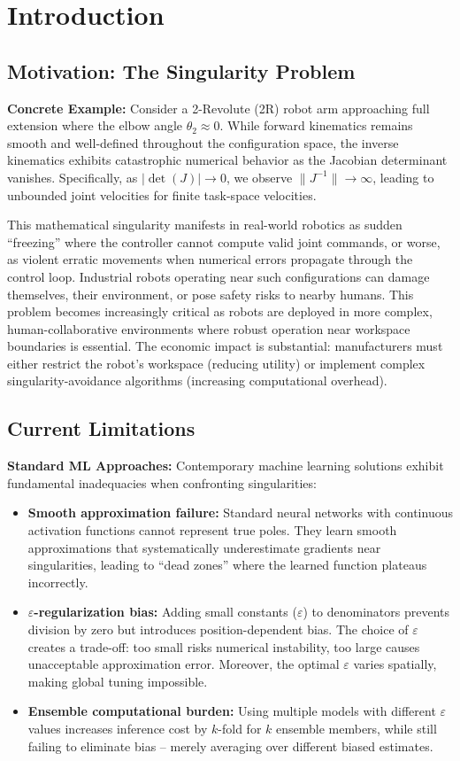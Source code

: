\documentclass[twoside,11pt]{article}
\begin{document}
\section{Introduction}
\subsection{Motivation: The Singularity Problem}
\textbf{Concrete Example:} Consider a 2-Revolute (2R) robot arm approaching full extension where the elbow angle $\theta_2 \approx 0$. While forward kinematics remains smooth and well-defined throughout the configuration space, the inverse kinematics exhibits catastrophic numerical behavior as the Jacobian determinant vanishes. Specifically, as $|\det(J)| \to 0$, we observe $\|J^{-1}\| \to \infty$, leading to unbounded joint velocities for finite task-space velocities.

This mathematical singularity manifests in real-world robotics as sudden ``freezing'' where the controller cannot compute valid joint commands, or worse, as violent erratic movements when numerical errors propagate through the control loop. Industrial robots operating near such configurations can damage themselves, their environment, or pose safety risks to nearby humans. This problem becomes increasingly critical as robots are deployed in more complex, human-collaborative environments where robust operation near workspace boundaries is essential. The economic impact is substantial: manufacturers must either restrict the robot's workspace (reducing utility) or implement complex singularity-avoidance algorithms (increasing computational overhead).
\subsection{Current Limitations}
\textbf{Standard ML Approaches:} Contemporary machine learning solutions exhibit fundamental inadequacies when confronting singularities:
\begin{itemize}
\item \textbf{Smooth approximation failure:} Standard neural networks with continuous activation functions cannot represent true poles. They learn smooth approximations that systematically underestimate gradients near singularities, leading to ``dead zones'' where the learned function plateaus incorrectly.
\item \textbf{$\varepsilon$-regularization bias:} Adding small constants ($\varepsilon$) to denominators prevents division by zero but introduces position-dependent bias. The choice of $\varepsilon$ creates a trade-off: too small risks numerical instability, too large causes unacceptable approximation error. Moreover, the optimal $\varepsilon$ varies spatially, making global tuning impossible.
\item \textbf{Ensemble computational burden:} Using multiple models with different $\varepsilon$ values increases inference cost by $k$-fold for $k$ ensemble members, while still failing to eliminate bias -- merely averaging over different biased estimates.
\end{itemize}
\end{document}
